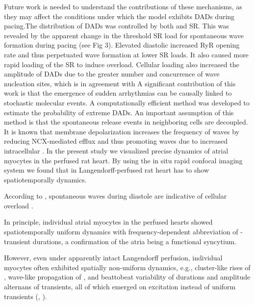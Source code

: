 \documentclass{biophys-new}
\begin{document}
Future work is needed to understand the contributions of these mechanisms, as they may
affect the conditions under which the model exhibits DADs during pacing.The distribution of DADs was controlled by both  and SR. This was revealed
by the apparent change in the threshold SR  load for spontaneous  wave formation
during pacing (see Fig 3). Elevated diastolic  increased RyR opening rate and thus perpetuated  wave formation at lower SR  loads. It also caused more rapid loading of the
SR to induce overload. Cellular  loading also increased the amplitude of DADs due to the
greater number and concurrence of  wave nucleation sites, which is in agreement with
A significant contribution of this work is that the emergence of sudden arrhythmias can be
causally linked to stochastic molecular events. A computationally efficient method was developed to estimate the probability of extreme DADs. An important assumption of this method is that the spontaneous  release events in neighboring cells are decoupled.
It is known that membrane depolarization increases the frequency of  waves by reducing NCX-mediated
 efflux and thus promoting  waves due to increased intracellular  \cite{walker2017estimating}.
In the present study we visualized precise  dynamics of atrial myocytes in the perfused rat heart.
By using the in situ rapid confocal imaging system
we found that in Langendorff-perfused rat heart has to show
spatiotemporally  dynamics.

According to \cite{macquaide2007measurement}, spontaneous  waves during diastole are indicative of cellular  overload .

In principle, individual atrial myocytes in the perfused hearts showed spatiotemporally uniform  dynamics with frequency-dependent abbreviation of -transient durations,
a confirmation of the atria being a functional syncytium.

However, even under apparently intact Langendorff perfusion,
individual myocytes often exhibited spatially non-uniform  dynamics,
e.g., cluster-like rises of , wave-like propagation of ,
and beattobeat variability of durations and amplitude alternans of  transients,
all of which emerged on excitation instead of uniform  transients (\cite{jiang2014pacing}, \cite{aguirre2014intravital}).


\end{document}

